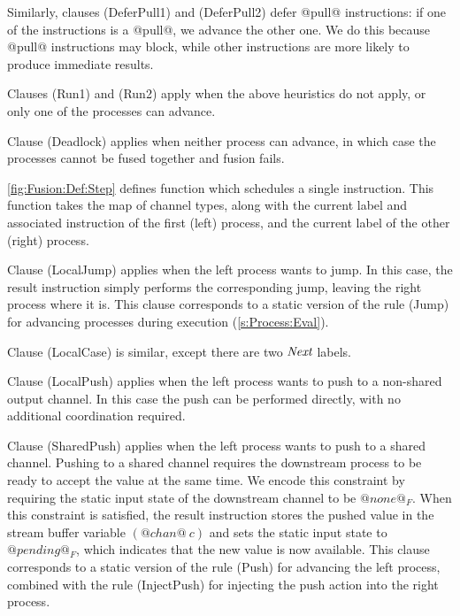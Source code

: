 Similarly, clauses (DeferPull1) and (DeferPull2) defer @pull@ instructions: if one of the instructions is a @pull@, we advance the other one. We do this because @pull@ instructions may block, while other instructions are more likely to produce immediate results.

Clauses (Run1) and (Run2) apply when the above heuristics do not apply, or only one of the processes can advance.

Clause (Deadlock) applies when neither process can advance, in which case the processes cannot be fused together and fusion fails.




\smallskip
\autoref{fig:Fusion:Def:Step} defines function  which schedules a single instruction. This function takes the map of channel types, along with the current label and associated instruction of the first (left) process, and the current label of the other (right) process.

Clause (LocalJump) applies when the left process wants to jump.
In this case, the result instruction simply performs the corresponding jump, leaving the right process where it is.
This clause corresponds to a static version of the rule (Jump) for advancing processes during execution (\autoref{s:Process:Eval}).

Clause (LocalCase) is similar, except there are two $\textit{Next}$ labels.

Clause (LocalPush) applies when the left process wants to push to a non-shared output channel.
In this case the push can be performed directly, with no additional coordination required.

Clause (SharedPush) applies when the left process wants to push to a shared channel.
Pushing to a shared channel requires the downstream process to be ready to accept the value at the same time.
We encode this constraint by requiring the static input state of the downstream channel to be $@none@_F$.
When this constraint is satisfied, the result instruction stores the pushed value in the stream buffer variable $(@chan@~c)$ and sets the static input state to $@pending@_F$, which indicates that the new value is now available.
This clause corresponds to a static version of the rule (Push) for advancing the left process, combined with the rule (InjectPush) for injecting the push action into the right process.

